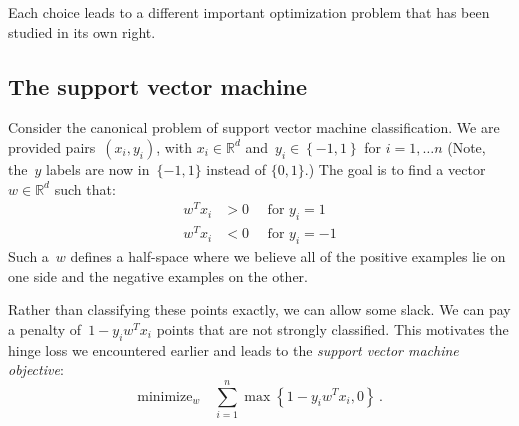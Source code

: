 \documentclass{tufte-book}
\begin{document}
Each choice leads to a different important optimization problem that has
been studied in its own right.

\hypertarget{the-support-vector-machine}{%
\subsection{The support vector
machine}\label{the-support-vector-machine}}


Consider the canonical problem of support vector machine classification.
We are provided pairs~\(\left(x_{i},y_{i}\right)\), with
\(x_{i}\in\mathbb{R}^{d}\) and~\(y_{i}\in\left\{ -1,1\right\}\) for
\(i=1,\ldots n\) (Note, the~\(y\) labels are now in~\(\{-1,1\}\) instead
of \(\{0,1\}\).) The goal is to find a vector~\(w\in \mathbb{R}^d\) such
that: \[
\begin{aligned}
w^{T}x_{i} & >  0\quad\text{ for }y_{i}=1\\
w^{T}x_{i} & < 0\quad\text{ for }y_{i}=-1
\end{aligned}
\] Such a~\(w\) defines a half-space where we believe all of the
positive examples lie on one side and the negative examples on the
other.

Rather than classifying these points exactly, we can allow some slack.
We can pay a penalty of~\(1-y_i w^T x_i\) points that are not strongly
classified. This motivates the hinge
loss we encountered
earlier and leads to the \emph{support vector machine objective}: \[
    \text{minimize}_w\quad  \sum_{i=1}^n \max\left\{1-y_i w^T x_i,0\right\} \,.
\]
\end{document}

